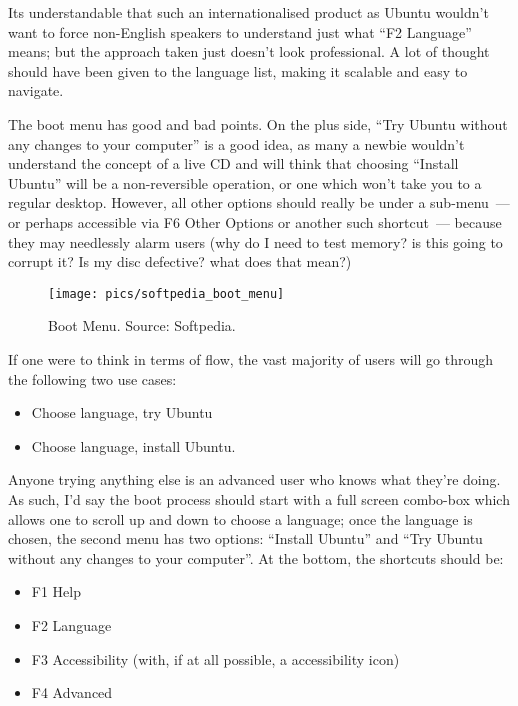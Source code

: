\documentclass{memoir}
\begin{document}
Its understandable that such an internationalised product as Ubuntu
wouldn't want to force non-English speakers to understand just what
``F2 Language'' means; but the approach taken just doesn't look
professional. A lot of thought should have been given to the language
list, making it scalable and easy to navigate.

The boot menu has good and bad points. On the plus side, ``Try Ubuntu
without any changes to your computer'' is a good idea, as many a
newbie wouldn't understand the concept of a live CD and will think
that choosing ``Install Ubuntu'' will be a non-reversible operation,
or one which won't take you to a regular desktop. However, all other
options should really be under a sub-menu~--- or perhaps accessible
via F6 Other Options or another such shortcut~--- because they may
needlessly alarm users (why do I need to test memory? is this going to
corrupt it? Is my disc defective? what does that mean?)

\begin{figure}
\begin{center}
\texttt{[image: pics/softpedia\_boot\_menu]}
\end{center}
\caption{Boot Menu. Source: Softpedia.}
\end{figure}

If one were to think in terms of flow, the vast majority of users will
go through the following two use cases:

\begin{itemize}
\item Choose language, try Ubuntu
\item Choose language, install Ubuntu.
\end{itemize}

Anyone trying anything else is an advanced user who knows what they're
doing. As such, I'd say the boot process should start with a full
screen combo-box which allows one to scroll up and down to choose a
language; once the language is chosen, the second menu has two
options: ``Install Ubuntu'' and ``Try Ubuntu without any changes to
your computer''. At the bottom, the shortcuts should be:

\begin{itemize}
\item F1 Help
\item F2 Language
\item F3 Accessibility (with, if at all possible, a accessibility icon)
\item F4 Advanced
\end{itemize}
\end{document}
